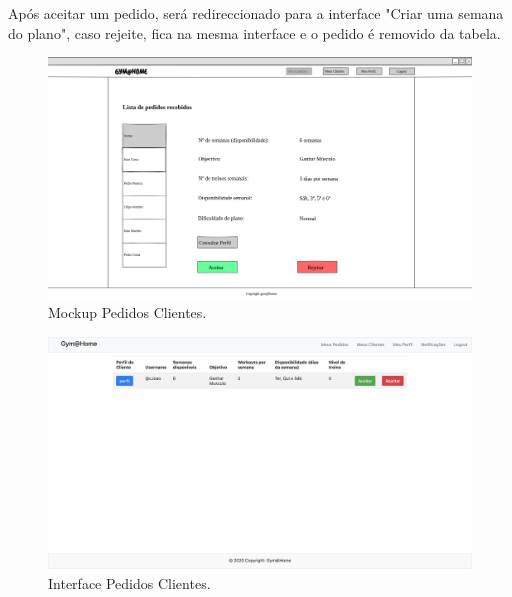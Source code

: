 \hspace{5mm} Após aceitar um pedido, será redireccionado para a interface "Criar uma semana do plano", caso rejeite, fica na mesma interface e o pedido é removido da tabela.

\begin{figure}[H]
    \centering
    \includegraphics[scale=0.25]{images/mockups/pt_meus_pedidos_joo_costa.png}
    \caption{Mockup Pedidos Clientes.}
    \label{fig:mockuppedidosclientes}
\end{figure}

\begin{figure}[H]
    \centering
    \includegraphics[scale=0.25]{images/interfaces/pt_meus_pedidos.png}
    \caption{Interface Pedidos Clientes.}
    \label{fig:interfacepedidosclientes}
\end{figure}

